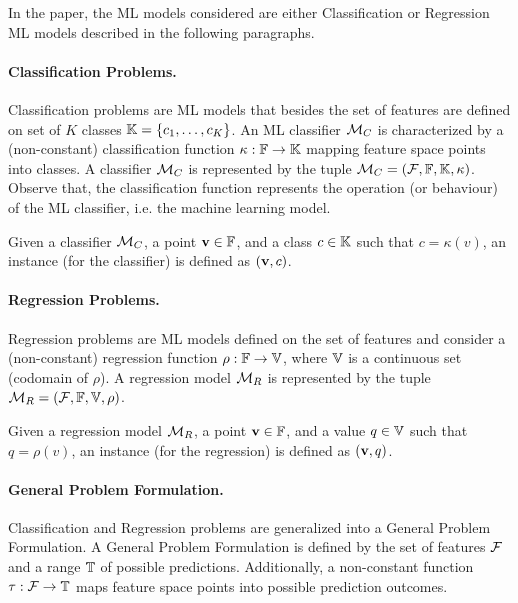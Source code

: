 In the paper, the ML models considered are either Classification or Regression ML models described in the following paragraphs.

\paragraph{Classification Problems.}

Classification problems are ML models that besides the set of features are defined on set of $K$ classes $\mathbb{K}=\{c_1,\ldots,c_K\}$.
%
An ML classifier ${\mathcal{M}}_C$ is characterized by a (non-constant) classification function $\kappa:\mathbb{F}\to\mathbb{K}$ mapping feature space points into classes.
%
A classifier ${\mathcal{M}}_C$ is represented by the tuple ${\mathcal{M}}_C=({\mathcal{F}}, \mathbb{F}, \mathbb{K}, \kappa)$.
%
Observe that, the classification function represents the operation (or behaviour) of the ML classifier, i.e. the machine learning model.


Given a classifier ${\mathcal{M}}_C$, a point $\mathbf{v}\in\mathbb{F}$, and a class $c\in\mathbb{K}$ such that $c=\kappa(v)$, an instance (for the classifier) is defined as $(\mathbf{v},c)$.

\paragraph{Regression Problems.}

Regression problems are ML models defined on the set of features and consider a (non-constant) regression function $\rho:\mathbb{F}\to\mathbb{V}$, where $\mathbb{V}$ is a continuous set (codomain of $\rho$).
%
A regression model ${\mathcal{M}}_R$ is represented by the tuple ${\mathcal{M}}_R=({\mathcal{F}}, \mathbb{F}, \mathbb{V}, \rho)$.


Given a regression model ${\mathcal{M}}_R$, a point $\mathbf{v}\in\mathbb{F}$, and a value $q\in\mathbb{V}$ such that $q=\rho(v)$, an instance (for the regression) is defined as $(\mathbf{v},q)$.


\paragraph{General Problem Formulation.}

Classification and Regression problems are generalized into a General Problem  Formulation.
%
A General Problem Formulation is defined by the set of features ${\mathcal{F}}$ and a range $\mathbb{T}$ of possible predictions.
%
Additionally, a non-constant function $\tau:{\mathcal{F}}\to\mathbb{T}$ maps feature space points into possible prediction outcomes.


